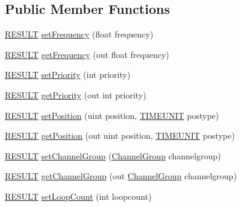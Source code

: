 \subsection*{Public Member Functions}
\begin{DoxyCompactItemize}
\item 
\hyperlink{namespace_f_m_o_d_a305d1176ef3f8c8815861a60407ac33d}{R\+E\+S\+U\+LT} \hyperlink{class_f_m_o_d_1_1_channel_a769a955cce0dd3335d46a201878eec0a}{set\+Frequency} (float frequency)
\item 
\hyperlink{namespace_f_m_o_d_a305d1176ef3f8c8815861a60407ac33d}{R\+E\+S\+U\+LT} \hyperlink{class_f_m_o_d_1_1_channel_a69cfa0718c64b66ef8d9ff31259f8a99}{get\+Frequency} (out float frequency)
\item 
\hyperlink{namespace_f_m_o_d_a305d1176ef3f8c8815861a60407ac33d}{R\+E\+S\+U\+LT} \hyperlink{class_f_m_o_d_1_1_channel_a0351346750ba8b05f5d4a4707bbf5222}{set\+Priority} (int priority)
\item 
\hyperlink{namespace_f_m_o_d_a305d1176ef3f8c8815861a60407ac33d}{R\+E\+S\+U\+LT} \hyperlink{class_f_m_o_d_1_1_channel_a6f71b3cb883ef8e0415a081e61cc08c1}{get\+Priority} (out int priority)
\item 
\hyperlink{namespace_f_m_o_d_a305d1176ef3f8c8815861a60407ac33d}{R\+E\+S\+U\+LT} \hyperlink{class_f_m_o_d_1_1_channel_a9d61bc77c395603baae27de1f2292f07}{set\+Position} (uint position, \hyperlink{namespace_f_m_o_d_aff20975332f93ff2180d2681cb43929f}{T\+I\+M\+E\+U\+N\+IT} postype)
\item 
\hyperlink{namespace_f_m_o_d_a305d1176ef3f8c8815861a60407ac33d}{R\+E\+S\+U\+LT} \hyperlink{class_f_m_o_d_1_1_channel_ae636f6655910d216554bf87d51a2fad9}{get\+Position} (out uint position, \hyperlink{namespace_f_m_o_d_aff20975332f93ff2180d2681cb43929f}{T\+I\+M\+E\+U\+N\+IT} postype)
\item 
\hyperlink{namespace_f_m_o_d_a305d1176ef3f8c8815861a60407ac33d}{R\+E\+S\+U\+LT} \hyperlink{class_f_m_o_d_1_1_channel_a8b4b96034d9deed870f8c7e0ef6b363c}{set\+Channel\+Group} (\hyperlink{class_f_m_o_d_1_1_channel_group}{Channel\+Group} channelgroup)
\item 
\hyperlink{namespace_f_m_o_d_a305d1176ef3f8c8815861a60407ac33d}{R\+E\+S\+U\+LT} \hyperlink{class_f_m_o_d_1_1_channel_a6090d298a16a30059959c2e62939ba25}{get\+Channel\+Group} (out \hyperlink{class_f_m_o_d_1_1_channel_group}{Channel\+Group} channelgroup)
\item 
\hyperlink{namespace_f_m_o_d_a305d1176ef3f8c8815861a60407ac33d}{R\+E\+S\+U\+LT} \hyperlink{class_f_m_o_d_1_1_channel_a413cad870e8cee17375773a9b364290b}{set\+Loop\+Count} (int loopcount)

\end{DoxyCompactItemize}
